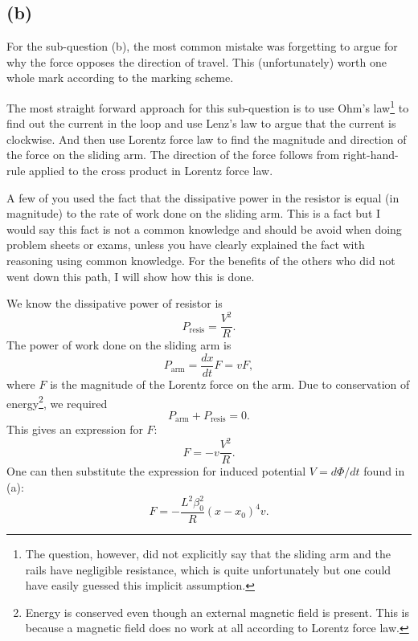 \documentclass[a4paper]{article}
\begin{document}
\subsection*{(b)}
For the sub-question (b), the most common mistake was forgetting to argue for why the force opposes the direction of travel. This (unfortunately) worth one whole mark according to the marking scheme.

The most straight forward approach for this sub-question is to use Ohm's law\footnote{The question, however, did not explicitly say that the sliding arm and the rails have negligible resistance, which is quite unfortunately but one could have easily guessed this implicit assumption.
} to find out the current in the loop and use Lenz's law to argue that the current is clockwise.
And then use Lorentz force law to find the magnitude and direction of the force on the sliding arm. The direction of the force follows from right-hand-rule applied to the cross product in Lorentz force law.

A few of you used the fact that the dissipative power in the resistor is equal (in magnitude) to the rate of work done on the sliding arm. This is a fact but I would say this fact is not a common knowledge and should be avoid when doing problem sheets or exams, unless you have clearly explained the fact with reasoning using common knowledge.
For the benefits of the others who did not went down this path, I will show how this is done.

We know the dissipative power of resistor is 
\[
P_\text{resis} = \frac{V^2}{R}
.\] 
The power of work done on the sliding arm is 
\[
    P_\text{arm} = \frac{dx}{dt} F = v F 
,\] 
where $F$ is the magnitude of the Lorentz force on the arm.
Due to conservation of energy\footnote{Energy is conserved even though an external magnetic field is present. This is because a magnetic field does no work at all according to Lorentz force law.}, we required
\[
P_\text{arm} + P_\text{resis} = 0
.\] 
This gives an expression for $F$:
 \[
F = - v \frac{V^2}{R}
.\] 
One can then substitute the expression for induced potential $V = d\Phi/dt$ found in (a):
 \[
     F = - \frac{L^2 \beta_0^2}{R} (x-x_0)^4 v
.\] 
\end{document}
